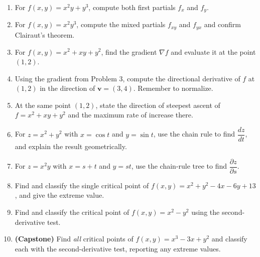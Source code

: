 \begin{enumerate}[leftmargin=2em]
    \item For $f(x,y) = x^2 y + y^3$, compute both first partials $f_x$ and
          $f_y$.

    \item For $f(x,y) = x^2 y^3$, compute the mixed partials $f_{xy}$ and
          $f_{yx}$ and confirm Clairaut's theorem.

    \item For $f(x,y) = x^2 + xy + y^2$, find the gradient $\nabla f$ and
          evaluate it at the point $(1,2)$.

    \item Using the gradient from Problem 3, compute the directional derivative of
          $f$ at $(1,2)$ in the direction of $\mathbf v = (3,4)$. Remember to
          normalize.

    \item At the same point $(1,2)$, state the direction of steepest ascent of
          $f=x^2+xy+y^2$ and the maximum rate of increase there.

    \item For $z = x^2 + y^2$ with $x = \cos t$ and $y = \sin t$, use the chain
          rule to find $\dfrac{dz}{dt}$, and explain the result geometrically.

    \item For $z = x^2 y$ with $x = s + t$ and $y = st$, use the chain-rule tree
          to find $\dfrac{\partial z}{\partial s}$.

    \item Find and classify the single critical point of
          $f(x,y) = x^2 + y^2 - 4x - 6y + 13$, and give the extreme value.

    \item Find and classify the critical point of $f(x,y) = x^2 - y^2$ using the
          second-derivative test.

    \item \textbf{(Capstone)} Find \emph{all} critical points of
          $f(x,y) = x^3 - 3x + y^2$ and classify each with the second-derivative
          test, reporting any extreme values.
\end{enumerate}

\clearpage
{}
{}
